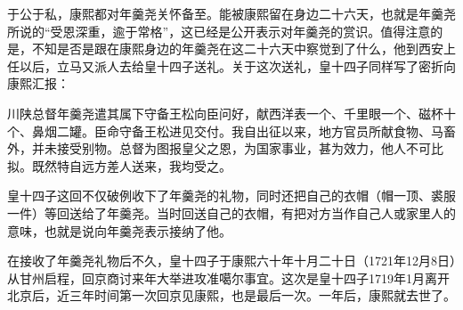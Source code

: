 
于公于私，康熙都对年羹尧关怀备至。能被康熙留在身边二十六天，也就是年羹尧所说的“受恩深重，逾于常格”，这已经是公开表示对年羹尧的赏识。值得注意的是，不知是否是跟在康熙身边的年羹尧在这二十六天中察觉到了什么，他到西安上任以后，立马又派人去给皇十四子送礼。关于这次送礼，皇十四子同样写了密折向康熙汇报：



\begin{bookquote}川陕总督年羹尧遣其属下守备王松向臣问好，献西洋表一个、千里眼一个、磁杯十个、鼻烟二罐。臣命守备王松进见交付。我自出征以来，地方官员所献食物、马畜外，并未接受别物。总督为图报皇父之恩，为国家事业，甚为效力，他人不可比拟。既然特自远方差人送来，我均受之。\end{bookquote}


皇十四子这回不仅破例收下了年羹尧的礼物，同时还把自己的衣帽（帽一顶、裘服一件）等回送给了年羹尧。当时回送自己的衣帽，有把对方当作自己人或家里人的意味，也就是说向年羹尧表示接纳了他。



在接收了年羹尧礼物后不久，皇十四子于康熙六十年十月二十日（1721年12月8日）从甘州启程，回京商讨来年大举进攻准噶尔事宜。这次是皇十四子1719年1月离开北京后，近三年时间第一次回京见康熙，也是最后一次。一年后，康熙就去世了。


